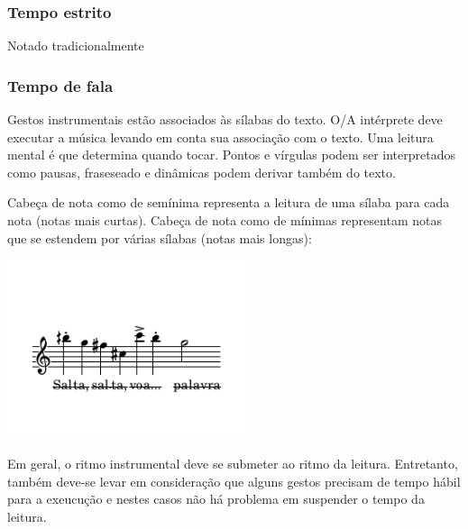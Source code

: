 \documentclass[article,12pt,openany,oneside,a4paper,chapter=TITLE,hyphen,english,brazil,chapter=TITLE,sumario=tradicional]{abntex2}
\begin{document}
\subsubsection*{Tempo estrito}
\label{sec:org737850d}
Notado tradicionalmente
\subsubsection*{Tempo de fala}
\label{sec:org8f27409}
Gestos instrumentais estão associados às sílabas do texto. O/A intérprete deve executar a música levando em conta sua associação com o texto. Uma leitura mental é que determina quando tocar. Pontos e vírgulas podem ser interpretados como pausas, fraseseado e dinâmicas podem derivar também do texto.

Cabeça de nota como de semínima representa a leitura de uma sílaba para cada nota (notas mais curtas). Cabeça de nota como de mínimas representam notas que se estendem por várias sílabas (notas mais longas):

\begin{center}
\includegraphics[width=7cm]{exemplo_tempo_fala.pdf}
\end{center}


Em geral, o ritmo instrumental deve se submeter ao ritmo da leitura. Entretanto, também deve-se levar em consideração que alguns gestos precisam de tempo hábil para a exeucução e nestes casos não há problema em suspender o tempo da leitura.



\end{document}
